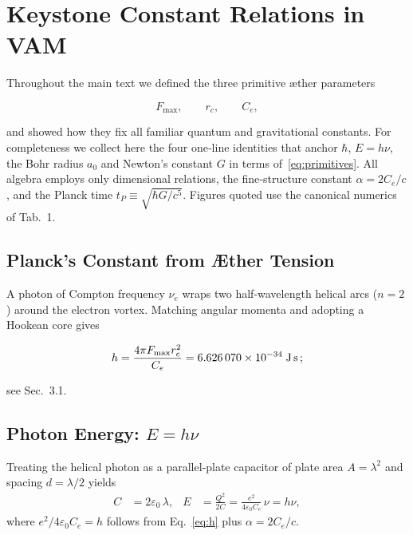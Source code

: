 

\section{Keystone Constant Relations in VAM}\label{sec:keystone-constant-relations-in-vam}

Throughout the main text we defined the three primitive æther parameters

\begin{equation}
    F_{\max}, \qquad r_c, \qquad C_e,
    \label{eq:primitives}
\end{equation}

and showed how they fix all familiar quantum and gravitational constants. For completeness we collect here the four one‑line identities that anchor \(\hbar\), \(E=h\nu\), the Bohr radius \(a_0\) and Newton's constant \(G\) in terms of~\eqref{eq:primitives}. All algebra employs only dimensional relations, the fine‑structure constant \(\alpha=2C_e/c\), and the Planck time \(t_P\equiv\sqrt{\hbar G/c^{5}}\). Figures quoted use the canonical numerics of Tab.~1.

\subsection{Planck's Constant from Æther Tension}
A photon of Compton frequency \(\nu_e\) wraps two half‑wavelength helical arcs (\(n=2\)) around the electron vortex. Matching angular momenta and adopting a Hookean core gives

\begin{equation}
    h = \frac{4\pi F_{\max} r_c^{2}}{C_e}
    = 6.626\,070\times10^{-34}\;\text{J\,s}\,;
    \label{eq:h}
\end{equation}

see Sec.~3.1.

\subsection{Photon Energy: \(E=h\nu\)}
Treating the helical photon as a parallel‑plate capacitor of plate area
\(A=\lambda^{2}\) and spacing \(d=\lambda/2\) yields
\begin{align}
    C &= 2\varepsilon_0\,\lambda, &
    E &= \frac{Q^{2}}{2C} = \frac{e^{2}}{4\varepsilon_{0}C_e}\,\nu
    = h\nu,
    \label{eq:Einstein}
\end{align}
where \(e^{2}/4\varepsilon_{0}C_e=h\) follows from Eq.~\eqref{eq:h} plus
\(\alpha=2C_e/c\).

